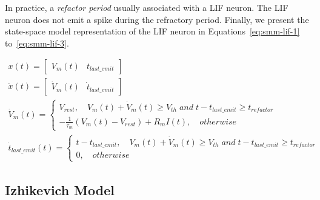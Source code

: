 In practice, a \textit{refactor period} usually associated with a LIF neuron. 
The LIF neuron does not emit a spike during the refractory period. 
Finally, we present the state-space model representation of the LIF neuron in Equations~\ref{eq:smm-lif-1}
to~\ref{eq:smm-lif-3}.

\begin{align}
    x(t) = \begin{bmatrix}V_m(t) & t_{last\_emit}\end{bmatrix} \label{eq:smm-lif-1} \\
    \dot x(t) = \begin{bmatrix}\dot V_m(t) & \dot t_{last\_emit}\end{bmatrix} \label{eq:smm-lif-2} \\
    \dot V_m(t) = \begin{cases}
        V_{rest}, \quad V_m(t) + \dot V_m(t) \ge V_{th}\;and\;t-t_{last\_emit}\ge t_{refactor}  \\
        -\frac{1}{\tau_m}(V_m(t)-V_{rest}) + R_mI(t),\quad otherwise
    \end{cases} \label{eq:smm-lif-3}\\
    \dot t_{last\_emit}(t) = \begin{cases}
        t-t_{last\_emit}, \quad V_m(t) + \dot V_m(t) \ge V_{th}\;and\;t-t_{last\_emit}\ge t_{refactor} \\
        0,\quad otherwise
    \end{cases} \label{eq:smm-lif-3}
\end{align}


\subsection{Izhikevich Model}


